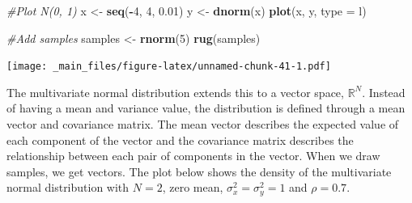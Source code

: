 \documentclass[
]{book}
\newenvironment{Shaded}{\begin{snugshade}}{\end{snugshade}}
\newcommand{\AttributeTok}[1]{\textcolor[rgb]{0.13,0.29,0.53}{#1}}
\newcommand{\CommentTok}[1]{\textcolor[rgb]{0.56,0.35,0.01}{\textit{#1}}}
\newcommand{\DecValTok}[1]{\textcolor[rgb]{0.00,0.00,0.81}{#1}}
\newcommand{\FloatTok}[1]{\textcolor[rgb]{0.00,0.00,0.81}{#1}}
\newcommand{\FunctionTok}[1]{\textcolor[rgb]{0.13,0.29,0.53}{\textbf{#1}}}
\newcommand{\NormalTok}[1]{#1}
\newcommand{\OtherTok}[1]{\textcolor[rgb]{0.56,0.35,0.01}{#1}}
\newcommand{\SpecialCharTok}[1]{\textcolor[rgb]{0.81,0.36,0.00}{\textbf{#1}}}
\newcommand{\StringTok}[1]{\textcolor[rgb]{0.31,0.60,0.02}{#1}}
\theoremstyle{definition}
\theoremstyle{definition}
\theoremstyle{definition}
\theoremstyle{definition}
\theoremstyle{remark}
\begin{document}
\begin{Shaded}
\begin{Highlighting}[]
\CommentTok{\#Plot N(0, 1)}
\NormalTok{x }\OtherTok{\textless{}{-}} \FunctionTok{seq}\NormalTok{(}\SpecialCharTok{{-}}\DecValTok{4}\NormalTok{, }\DecValTok{4}\NormalTok{, }\FloatTok{0.01}\NormalTok{)}
\NormalTok{y }\OtherTok{\textless{}{-}} \FunctionTok{dnorm}\NormalTok{(x)}
\FunctionTok{plot}\NormalTok{(x, y, }\AttributeTok{type =} \StringTok{\textquotesingle{}l\textquotesingle{}}\NormalTok{)}

\CommentTok{\#Add samples}
\NormalTok{samples }\OtherTok{\textless{}{-}} \FunctionTok{rnorm}\NormalTok{(}\DecValTok{5}\NormalTok{)}
\FunctionTok{rug}\NormalTok{(samples)}
\end{Highlighting}
\end{Shaded}

\texttt{[image: \_main\_files/figure-latex/unnamed-chunk-41-1.pdf]}

The multivariate normal distribution extends this to a vector space, \(\mathbb{R}^N\). Instead of having a mean and variance value, the distribution is defined through a mean vector and covariance matrix. The mean vector describes the expected value of each component of the vector and the covariance matrix describes the relationship between each pair of components in the vector. When we draw samples, we get vectors. The plot below shows the density of the multivariate normal distribution with \(N = 2\), zero mean, \(\sigma^2_x = \sigma^2_y = 1\) and \(\rho = 0.7\).
\end{document}
